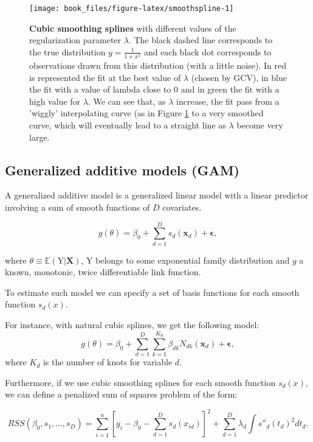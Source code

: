 \documentclass[]{book}
\begin{document}
\begin{figure}

{\centering \texttt{[image: book\_files/figure-latex/smoothspline-1]} 

}

\caption{\textbf{Cubic smoothing splines} with different values of the regularization parameter \(\lambda\). The black dashed line corresponds to the true distribution \(y = \frac{1}{1+x^2}\) and each black dot corresponds to observations drawn from this distribution (with a little noise). In red is represented the fit at the best value of \(\lambda\) (chosen by GCV), in blue the fit with a value of lambda close to \(0\) and in green the fit with a high value for \(\lambda\). We can see that, as \(\lambda\) increase, the fit pass from a 'wiggly' interpolating curve (as in Figure \ref{fig:smoothspline} to a very smoothed curve, which will eventually lead to a straight line as \(\lambda\) become very large.}\label{fig:smoothspline}
\end{figure}

\hypertarget{gam}{%
\subsection{Generalized additive models (GAM)}\label{gam}}

A generalized additive model \citep{hastie_generalized_1990} is a generalized
linear model with a linear predictor involving a sum of smooth functions
of \(D\) covariates.

\[g(\theta) = \beta_0 + \sum_{d=1}^D s_d(\boldsymbol{x}_d) + \boldsymbol{\epsilon} ,
\label{eq:gam}\]

where \(\theta \equiv \mathbb{E}(\mathrm{Y} | \mathbf{X})\), \(\mathrm{Y}\) belongs to some
exponential family distribution and \(g\) a known, monotonic, twice
differentiable link function.

To estimate such model we can specify a set of basis functions for each
smooth function \(s_d(x)\).

For instance, with natural cubic splines, we get the following model:
\[g(\theta) = \beta_0 + \sum_{d=1}^D \sum_{k=1}^{K_d} \beta_{dk} N_{dk}(\boldsymbol{x}_d) + \boldsymbol{\epsilon} ,\]
where \(K_d\) is the number of knots for variable \(d\).

Furthermore, if we use cubic smoothing splines for each smooth function
\(s_d(x)\), we can define a penalized sum of squares problem of the form:

\[RSS(\beta_0, s_1, \dots, s_D) = \sum_{i=1}^n [y_i - \beta_0 - \sum_{d=1}^D s_d(x_{id})]^2 + \sum_{d=1}^D \lambda_d \int s''_d(t_d)^2dt_d.\]
\end{document}
